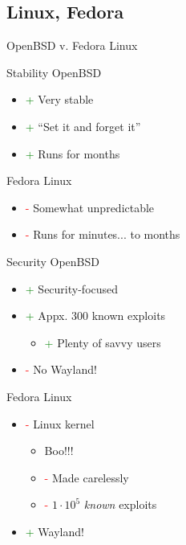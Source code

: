 \documentclass{beamer}
\newcommand{\good}{\textcolor{green}{+ }}
\newcommand{\bad}{\textcolor{red}{- }}
\begin{document}
		\subsection{Linux, Fedora}
			\begin{frame}
				\begin{center}
					OpenBSD v. Fedora Linux
				\end{center}
			\end{frame}
			\begin{frame}{Stability}
				OpenBSD
				\begin{itemize}
					\item \good Very stable
					\item \good ``Set it and forget it''
					\item \good Runs for months
				\end{itemize}
				Fedora Linux
				\begin{itemize}
					\item \bad Somewhat unpredictable
					\item \bad Runs for minutes... to months
				\end{itemize}
			\end{frame}
			\begin{frame}{Security}
				OpenBSD
				\begin{itemize}
					\item \good Security-focused
					\item \good Appx. 300 known exploits
					\begin{itemize}
						\item \good Plenty of savvy users
					\end{itemize}
					\item \bad No Wayland!
				\end{itemize}
				Fedora Linux
				\begin{itemize}
					\item \bad Linux kernel
					\begin{itemize}
						\item Boo!!!
						\item \bad Made carelessly
						\item \bad $1\cdot10^5$ \textit{known} exploits
					\end{itemize}
					\item \good Wayland!
				\end{itemize}
			\end{frame}
\end{document}

